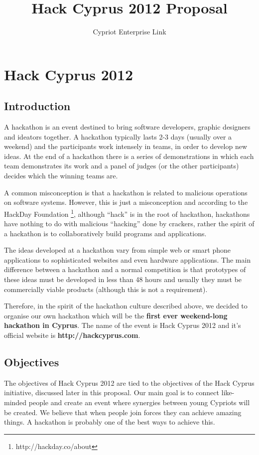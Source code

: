 \documentclass[a4paper,11pt]{report}
\title{Hack Cyprus 2012 Proposal}
\author{Cypriot Enterprise Link}
\begin{document}
\maketitle
\tableofcontents
\chapter{Hack Cyprus 2012}
\section{Introduction}
A hackathon is an event destined to bring software developers, graphic designers and ideators together. A hackathon typically lasts 2-3 days (usually over a weekend) and the participants work intensely in teams, in order to develop new ideas. At the end of a hackathon there is a series of demonstrations in which each team demonstrates its work and a panel of judges (or the other participants) decides which the winning teams are.

A common misconception is that a hackathon is related to malicious operations on software systems. However, this is just a misconception and according to the HackDay Foundation \footnote{http://hackday.co/about}, although “hack” is in the root of hackathon, hackathons have nothing to do with malicious “hacking” done by crackers, rather the spirit of a hackathon is to collaboratively build programs and applications.

The ideas developed at a hackathon vary from simple web or smart phone applications to sophisticated websites and even hardware applications. The main difference between a hackathon and a normal competition is that prototypes of these ideas must be developed in less than 48 hours and usually they must be commercially viable products (although this is not a requirement).  

Therefore, in the spirit of the hackathon culture described above, we decided to organise our own hackathon which will be the \textbf{first ever weekend-long hackathon in Cyprus}. The name of the event is Hack Cyprus 2012 and it's official website is \textbf{http://hackcyprus.com}.

\section{Objectives}
The objectives of Hack Cyprus 2012 are tied to the objectives of the Hack Cyprus initiative, discussed later in this proposal. Our main goal is to connect like-minded people and create an event where synergies between young Cypriots will be created. We believe that when people join forces they can achieve amazing things. A hackathon is probably one of the best ways to achieve this. 
\end{document}

